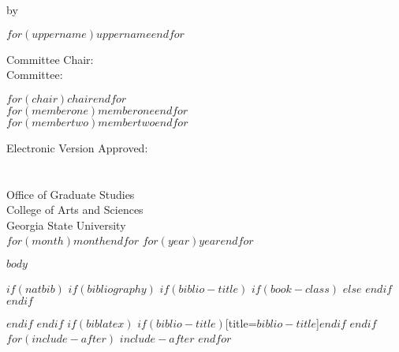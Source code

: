 \documentclass[12pt]{report}
\begin{document}
  \vspace*{0.5in}
  \centerline{by}
  \vspace*{0.5in}
  \centerline{$for(uppername)$$uppername$$endfor$}
  \vspace*{1in}

  \hspace{0.33\textwidth}
  \begin{minipage}[t]{0.33\textwidth}
  Committee Chair:\\
  Committee: \\
  \end{minipage}%
  \begin{minipage}[t]{0.33\textwidth}
  \begin{flushright}
  $for(chair)$$chair$$endfor$ \\
  $for(memberone)$$memberone$$endfor$ \\
  $for(membertwo)$$membertwo$$endfor$ \\
  \end{flushright}
  \end{minipage}%
  \vspace{1cm}

  \parbox[b]{\textwidth}{
  Electronic Version Approved:\\\\\\
  Office of Graduate Studies\\
  College of Arts and Sciences\\
  Georgia State University\\
  $for(month)$$month$$endfor$ $for(year)$$year$$endfor$
  }



\thispagestyle{empty}
\setlength{\abovedisplayskip}{-5pt}
\setlength{\abovedisplayshortskip}{-5pt}



$body$

{}

\newpage



$if(natbib)$
	$if(bibliography)$
	$if(biblio-title)$
	$if(book-class)$
	\renewcommand\bibname{$biblio-title$}
	$else$
	\renewcommand\refname{$biblio-title$}
	$endif$
	$endif$
	
	$endif$
	$endif$
	$if(biblatex)$
	\printbibliography$if(biblio-title)$[title=$biblio-title$]$endif$
	$endif$
	$for(include-after)$
	$include-after$
	$endfor$
\end{document}
